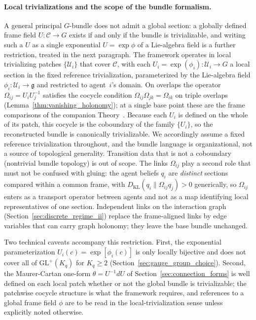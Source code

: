 \paragraph{Local trivializations and the scope of the bundle formalism.}
\label{sec:local_trivialization}
A general principal $G$-bundle does not admit a global section: a globally defined frame field $U: \mathcal{C} \to G$ exists if and only if the bundle is trivializable, and writing such a $U$ as a single exponential $U = \exp\phi$ of a Lie-algebra field is a further restriction, treated in the next paragraph. The framework operates in local trivializing patches $\{\mathcal{U}_i\}$ that cover $\mathcal{C}$, with each $U_i = \exp(\phi_i): \mathcal{U}_i \to G$ a local section in the fixed reference trivialization, parameterized by the Lie-algebra field $\phi_i: \mathcal{U}_i \to \mathfrak{g}$ and restricted to agent~$i$'s domain. On overlaps the operator $\Omega_{ij} = U_iU_j^{-1}$ satisfies the cocycle condition $\Omega_{ij}\Omega_{jk} = \Omega_{ik}$ on triple overlaps (Lemma~\ref{thm:vanishing_holonomy}); at a single base point these are the frame comparisons of the companion Theory~\cite[Ch.~2]{DennisGaugeVFE2026}. Because each $U_i$ is defined on the whole of its patch, this cocycle is the coboundary of the family $\{U_i\}$, so the reconstructed bundle is canonically trivializable. We accordingly assume a fixed reference trivialization throughout, and the bundle language is organizational, not a source of topological generality. Transition data that is not a coboundary (nontrivial bundle topology) is out of scope. The links $\Omega_{ij}$ play a second role that must not be confused with gluing: the agent beliefs $q_i$ are \emph{distinct} sections compared within a common frame, with $D_{\mathrm{KL}}(q_i \| \Omega_{ij} q_j) > 0$ generically, so $\Omega_{ij}$ enters as a transport operator between agents and not as a map identifying local representatives of one section. Independent links on the interaction graph (Section~\ref{sec:discrete_regime_ii}) replace the frame-aligned links by edge variables that can carry graph holonomy; they leave the base bundle unchanged.

Two technical caveats accompany this restriction. First, the exponential parameterization $U_i(c)=\exp[\phi_i(c)]$ is only locally bijective and does not cover all of $\mathrm{GL}^+(K_q)$ for $K_q \geq 2$ (Section~\ref{sec:gauge_group_choice}). Second, the Maurer-Cartan one-form $\theta=U^{-1}dU$ of Section~\ref{sec:connection_forms} is well defined on each local patch whether or not the global bundle is trivializable; the patchwise cocycle structure is what the framework requires, and references to a global frame field $\phi$ are to be read in the local-trivialization sense unless explicitly noted otherwise.

